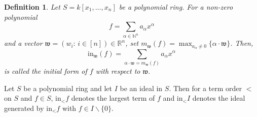 \documentclass[11pt,a4paper,reqno]{amsart}
\newtheorem{definition}[thm]{Definition}
\theoremstyle{definition}
\numberwithin{equation}{section}
\def\NN{\mathbb{N}}
\begin{document}
\begin{definition}
Let $S=k[x_1, \ldots,x_n]$ be a polynomial ring. For a non-zero polynomial $$f= \sum_{\alpha \in \NN^{n}}a_{\alpha}x^{\alpha}$$ and a vector $\mathfrak{w}=(w_i: \, i \in [n]) \in \mathbb{R}^{n}$, set $m_{\mathfrak{w}}(f)=\max_{a_{\alpha} \neq 0} \{ \alpha \cdot \mathfrak{w} \}$. Then, $$ \text{in}_{\mathfrak{w}}(f)= \sum_{\alpha \cdot \mathfrak{w}=m_{\mathfrak{w}}(f)}a_{\alpha}x^{\alpha} $$ is called the initial form of $f$ with respect to $\mathfrak{w}.$
\end{definition}

Let $S$ be a polynomial ring and let $I$ be an ideal in $S$. Then for a term order $<$ on $S$ and $f \in S$, in$_<f$ denotes the largest term of $f$ and in$_<I$ denotes the ideal generated by in$_<f$ with $f \in I \backslash \{0\}$.
\end{document}
